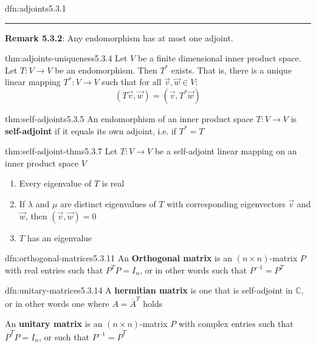 \documentclass[landscape, 8pt]{extarticle}
\begin{document}
\begin{multicols}{3}
\begin{dfn}[Adjoints]{dfn:adjoints}{5.3.1}
    \noindent\rule{\textwidth}{0.2pt}
    \textbf{Remark 5.3.2}: Any endomorphism has at most one adjoint.
\end{dfn}

\begin{thm}[]{thm:adjoints-uniqueness}{5.3.4}
    Let $V$ be a finite dimensional inner product space. Let $T : V \to V$ be an endomorphism. Then $T^{*}$ exists. That is, there is a unique linear mapping $T^{*} : V \to V$ such that for all $\vec{v}, \vec{w}\in V$:
    \[(T \vec{v}, \vec{w}) = (\vec{v}, T^{*}\vec{w})\]
\end{thm}

\begin{dfn}{thm:self-adjoints}{5.3.5}
    An endomorphism of an inner product space $T : V \to V$ is \textbf{self-adjoint} if it equals its own adjoint, i.e. if $T^{*} = T$
\end{dfn}

\begin{thm}{thm:self-adjoint-thms}{5.3.7}
    Let $T : V\to V$ be a self-adjoint linear mapping on an inner product space $V$
    \begin{enumerate}
        \setlength\itemsep{0em}
        \item Every eigenvalue of $T$ is real
        \item If $\lambda$ and $\mu$ are distinct eigenvalues of $T$ with corresponding eigenvectors $\vec{v}$ and $\vec{w}$, then $(\vec{v}, \vec{w}) = 0$
        \item $T$ has an eigenvalue
    \end{enumerate}
\end{thm}

\begin{dfn}{dfn:orthogonal-matrices}{5.3.11}
    An \textbf{Orthogonal matrix} is an $(n \times n)$-matrix $P$ with real entries such that $P^{T}P = I_{n}$, or in other words such that $P^{-1} = P^{T}$
\end{dfn}

\begin{dfn}{dfn:unitary-matrices}{5.3.14}
    A \textbf{hermitian matrix} is one that is self-adjoint in $\mathbb{C}$, or in other words one where $A = \overline{A}^{T}$ holds


    An \textbf{unitary matrix} is an $(n \times n)$-matrix $P$ with complex entries such that $\overline{P}^{T}P = I_{n}$, or such that $P^{-1} = \overline{P}^{T}$
\end{dfn}


\end{multicols}
\end{document}

